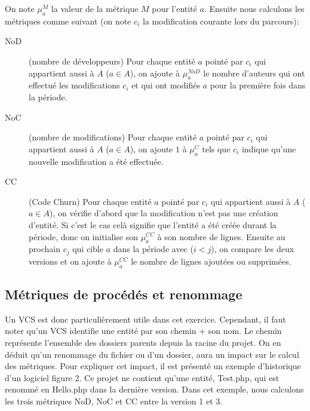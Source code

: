  On note $\mu_{a}^{M}$ la valeur de la métrique $M$ pour l'entité $a$. Ensuite nous calculons les métriques comme suivant (on note $c_i$ la modification courante lors du parcours):
\begin{description}
	\item[NoD] (nombre de développeurs) Pour chaque entité $a$ pointé par $c_i$ qui appartient aussi à $A$ ($a \in A$), on ajoute à $\mu_{a}^{NoD}$ le nombre d'auteurs qui ont effectué les modifications $c_i$ et qui ont modifiés $a$ pour la première fois dans la période.
	\item[NoC] (nombre de modifications) Pour chaque entité $a$ pointé par $c_i$ qui appartient aussi à $A$ ($a \in A$), on ajoute $1$ à $\mu_{a}^{C}$ tels que $c_i$ indique qu'une nouvelle modification a été effectuée.
	\item[CC] (Code Churn) Pour chaque entité $a$ pointé par $c_i$ qui appartient aussi à $A$ ($a \in A$), on vérifie d'abord que la modification n'est pas une création d'entité. Si c'est le cas celà signifie que l'entité a été créée durant la période, donc on initialise son $\mu_{a}^{CC}$ à son nombre de lignes. Ensuite au prochain $c_j$ qui cible $a$ dans la période avec ($i < j$), on compare les deux versions et on ajoute à $\mu_{a}^{CC}$ le nombre de lignes ajoutées ou supprimées.
\end{description}


\subsection{Métriques de procédés et renommage}

Un VCS est donc particulièrement utile dans cet exercice. Cependant, il faut noter qu'un VCS identifie une entité par son chemin $+$ son nom. Le chemin représente l'ensemble des dossiers parents depuis la racine du projet. On en déduit qu'un renommage du fichier ou d'un dossier, aura un impact sur le calcul des métriques. Pour expliquer cet impact, il est présenté un exemple d'historique d'un logiciel figure 2. Ce projet ne contient qu'une entité, Test.php, qui est renommé en Hello.php dans la dernière version. Dans cet exemple, nous calculons les trois métriques NoD, NoC et CC entre la version 1 et 3.\\

